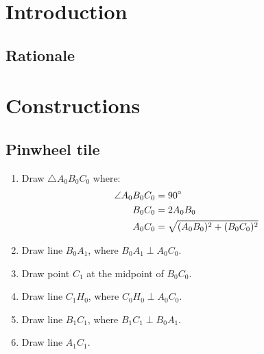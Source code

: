 \section{Introduction}
\subsection{Rationale}

\newpage
\section{Constructions}
\subsection{Pinwheel tile}
\begin{enumerate}
    \item Draw $\triangle A_{0}B_{0}C_{0}$ where:
    \begin{equation}
        \begin{aligned}
            \angle A_{0}B_{0}C_{0} &= 90\degree \\
            B_{0}C_{0} &= 2A_{0}B_{0} \\
            A_{0}C_{0} &= \sqrt{(A_{0}B_{0})^2 + (B_{0}C_{0})^2} \\
        \end{aligned}
    \end{equation}
    \begin{figure}[H]
        \centering
        \label{right-triangle}
    \end{figure}

    \item Draw line $B_{0}A_{1}$, where $B_{0}A_{1} \perp A_{0}C_{0}$.
    \item Draw point $C_{1}$ at the midpoint of $B_{0}C_{0}$.
    \item Draw line $C_{1}H_{0}$, where $C_{0}H_{0} \perp A_{0}C_{0}$.
    \item Draw line $B_{1}C_{1}$, where $B_{1}C_{1} \perp B_{0}A_{1}$.
    \item Draw line $A_{1}C_{1}$.
\end{enumerate}


